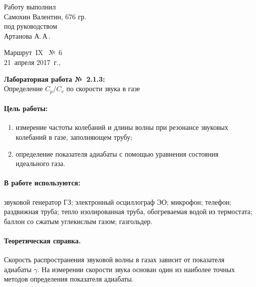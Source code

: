 \documentclass[12pt]{article}
\begin{document}
	\begin{minipage}{0.45\linewidth}
	Работу выполнил\\
	Самохин Валентин, 676 гр.\\[2mm]
	под руководством\\
	Артанова А.\,А\,.
	\end{minipage}
	\hfill
	\begin{minipage}{0.45\linewidth}\flushright
		Маршрут~IX \ №~6\\[3mm]
		21~апреля 2017~г.,\\
		\end{minipage}
		
		\vspace{8mm}
		\begin{center}
			\textbf{\Large Лабораторная работа №~2.1.3:}\\[\parskip]
			\LARGE Определение $C_p/C_v$ по скорости звука в газе
			\end{center}
			\vspace{0mm}
			
			\paragraph{Цель работы:}
			\begin{enumerate}
				\item измерение частоты колебаний и длины волны при резонансе звуковых колебаний в газе, заполняющем трубу;
				\item определение показателя адиабаты с помощью уравнения состояния идеального газа.
			\end{enumerate}
			
			\paragraph{В работе используются:}
			звуковой генератор ГЗ; электронный
			осциллограф ЭО; микрофон; телефон; раздвижная труба; тепло
			изолированная труба, обогреваемая водой из термостата; баллон
			со сжатым углекислым газом; газгольдер.
			
			
			\vspace{2\parskip}
		\paragraph{Теоретическая справка.}
			Скорость распространения звуковой волны в газах зависит от показателя адиабаты $\gamma$. На измерении скорости звука основан один из наиболее точных методов определения показателя адиабаты.
			
\end{document}
